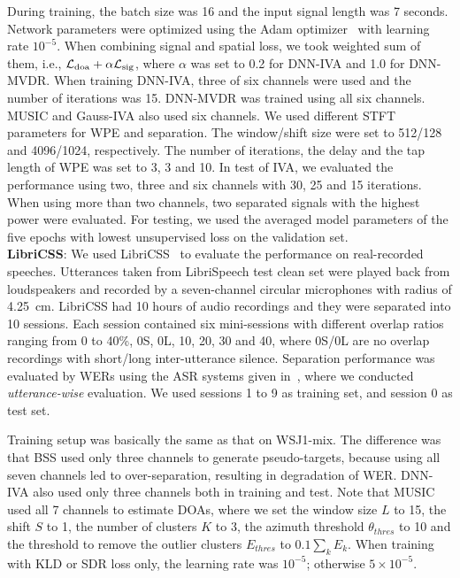 \documentclass[a4paper]{article}
\begin{document}
During training, the batch size was 16 and the input signal length was 7 seconds. 
Network parameters were optimized using the Adam optimizer~\cite{adam} with learning rate $10^{-5}$.
When combining signal and spatial loss, we took weighted sum of them, i.e., $\mathcal{L}_{\rm{doa}}+\alpha \mathcal{L}_{\rm{sig}}$, where $\alpha$ was set to 0.2 for DNN-IVA and 1.0 for DNN-MVDR.
When training DNN-IVA, three of six channels were used and the number of iterations was 15.
DNN-MVDR was trained using all six channels.
MUSIC and Gauss-IVA also used six channels.
We used different STFT parameters for WPE and separation.
The window/shift size were set to 512/128 and 4096/1024, respectively.
The number of iterations, the delay and the tap length of WPE was set to 3, 3 and 10.
In test of IVA, we evaluated the performance using two, three and six channels with 30, 25 and 15 iterations.
When using more than two channels, two separated signals with the highest power were evaluated.
For testing, we used the averaged model parameters of the five epochs with lowest unsupervised loss on the validation set.
\\
\textbf{LibriCSS}:
We used LibriCSS~\cite{libricss} to evaluate the performance on real-recorded speeches.
Utterances taken from LibriSpeech test clean set were played back from loudspeakers and recorded by a seven-channel circular microphones with radius of 4.25~cm.
LibriCSS had 10 hours of audio recordings and they were separated into 10 sessions.
Each session contained six mini-sessions with different overlap ratios ranging from 0 to 40\%, 0S, 0L, 10, 20, 30 and 40, where 0S/0L are no overlap recordings with short/long inter-utterance silence.
Separation performance was evaluated by WERs using the ASR systems given in~\cite{libricss}, where we conducted \textit{utterance-wise} evaluation.
We used sessions 1 to 9 as training set, and session 0 as test set.

Training setup was basically the same as that on WSJ1-mix.
The difference was that BSS used only three channels to generate pseudo-targets, because using all seven channels led to over-separation, resulting in degradation of WER.
DNN-IVA also used only three channels both in training and test.
Note that MUSIC used all 7 channels to estimate DOAs, where we set the window size $L$ to 15, the shift $S$ to 1, the number of clusters $K$ to 3, the azimuth threshold $\theta_{thres}$ to 10 and the threshold to remove the outlier clusters $E_{thres}$ to $0.1\sum_{k} {E_k}$.
When training with KLD or SDR loss only, the learning rate was $10^{-5}$; otherwise $5\times 10^{-5}$.
\end{document}
